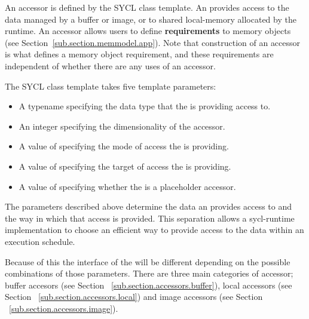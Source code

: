 %


An \gls{accessor} is defined by the SYCL  class template.
An  provides access to the data managed by a \gls{buffer}
or \gls{image}, or to shared \gls{local-memory} allocated by the runtime. An
\gls{accessor} allows users to define \textbf{requirements} to memory objects
(see Section~\ref{sub.section.memmodel.app}).  Note that construction of an
\gls{accessor} is what defines a memory object requirement, and these
requirements are independent of whether there are any uses of an \gls{accessor}.

The SYCL  class template takes five template parameters:

\begin{itemize}
\item A typename specifying the data type that the  is
providing access to.
\item An integer specifying the dimensionality of the accessor.
\item A value of  specifying the mode of access the
 is providing.
\item A value of  specifying the target of access
the  is providing.
\item A value of  specifying whether the
 is a placeholder accessor.
\end{itemize}

The parameters described above determine the data an 
provides access to and the way in which that access is provided. This separation
allows a \gls{sycl-runtime} implementation to choose an efficient way to provide
access to the data within an execution schedule.

Because of this the interface of the  will
be different depending on the possible combinations of those parameters. There
are three main categories of accessor; buffer accesors (see Section%
~\ref{sub.section.accessors.buffer}), local accessors (see Section%
~\ref{sub.section.accessors.local}) and image accessors (see Section%
~\ref{sub.section.accessors.image}).

